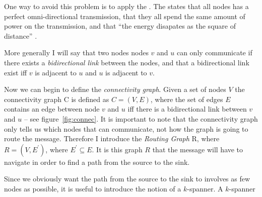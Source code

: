 One way to avoid this problem is to apply the \uga. The \uga states that all nodes has a perfect omni-directional transmission, that they all spend the same amount of power on the transmission, and that ``the energy disapates as the square of distance'' \cite{practical}.

More generally I will say that two nodes nodes $v$ and $u$ can only communicate if there exists a \emph{bidirectional link} between the nodes, and that a bidirectional link exist iff $v$ is adjacent to $u$ and $u$ is adjacent to $v$.


Now we can begin to define the \emph{connectivity graph}. Given a set of nodes $V$ the connectivity graph C is defined as $C = (V, E)$, where the set of edges $E$ contains an edge between node $v$ and $u$ iff there is a bidirectional link between $v$ and $u$ -- see figure~\ref{fig:connec}. It is important to note that the connectivity graph only tells us which nodes that can communicate, not how the graph is going to route the message. Therefore I introduce the \emph{Routing Graph} R, where $R = (V, E^{\prime})$, where $E^{\prime} \subseteq E$. It is this graph $R$ that the message will have to navigate in order to find a path from the source to the sink.

Since we obviously want the path from the source to the sink to involves as few nodes as possible, it is useful to introduce the notion of a $k$-spanner. A $k$-spanner 


